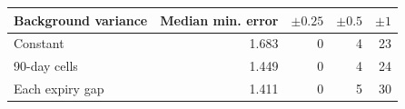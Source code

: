\begin{tabular}{lrrrr}\toprule Background variance & Median min. error & $\pm0.25$ & $\pm0.5$ & $\pm1$ \\\midrule
Constant & 1.683 & 0 & 4 & 23 \\
90-day cells & 1.449 & 0 & 4 & 24 \\
Each expiry gap & 1.411 & 0 & 5 & 30 \\
\bottomrule\end{tabular}
